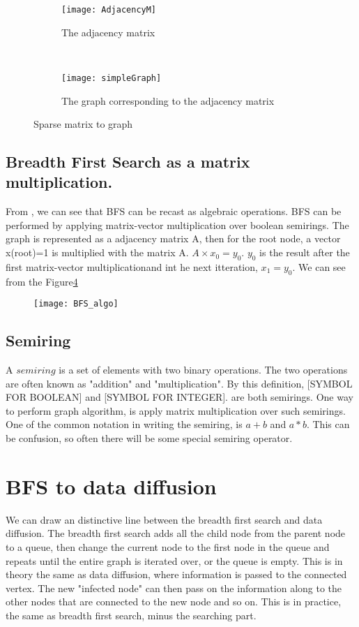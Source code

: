 {\begin{figure}
	\begin{subfigure}{0.5\textwidth}
	\texttt{[image: AdjacencyM]}
	\caption{The adjacency matrix}
	\label{fig:AdjacencyM}
	\end{subfigure}
	~
	\begin{subfigure}{0.5\textwidth}
	\texttt{[image: simpleGraph]}
	\caption{The graph corresponding to the adjacency matrix}
	\label{fig:matrix}
	\end{subfigure}
 	\caption{Sparse matrix to graph}
 	\label{AdjaToMatrix}
\end{figure}

\subsection{Breadth First Search as a matrix multiplication.}
From \cite{AlgoToMath}, we can see that BFS can be recast as algebraic operations. BFS can be performed by applying matrix-vector multiplication over boolean semirings\cite{HybridBFS2015}. The graph is represented as a adjacency matrix A, then for the root node, a vector x(root)=1 is multiplied with the matrix A. $A \times x_0 = y_0$. $y_0$ is the result after the first matrix-vector multiplicationand int he next itteration, $x_1 = y_0$. We can see from the Figure\ref{fig:bfsMatrix}

\begin{figure}
	
	\texttt{[image: BFS\_algo]}
	\label{fig:bfsMatrix}
\end{figure}



\subsection{Semiring}
A $semiring$ is a set of elements with two binary operations. The two operations are often known as "addition" and "multiplication". By this definition, [SYMBOL FOR BOOLEAN] and [SYMBOL FOR INTEGER]. are both semirings.  One way to perform graph algorithm, is apply matrix multiplication over such semirings. One of the common notation in writing the semiring, is $a+b$ and $a \ast b$. This can be confusion, so often there will be some special semiring operator.



\section{BFS to data diffusion}
We can draw an distinctive line between the breadth first search and data diffusion. The breadth first search adds all the child node from the parent node to a queue, then change the current node to the first node in the queue and repeats until the entire graph is iterated over, or the queue is empty. This is in theory the same as data diffusion, where information is passed to the connected vertex. The new "infected node" can then pass on the information along to the other nodes that are connected to the new node and so on. This is in practice, the same as breadth first search, minus the searching part. 

}
